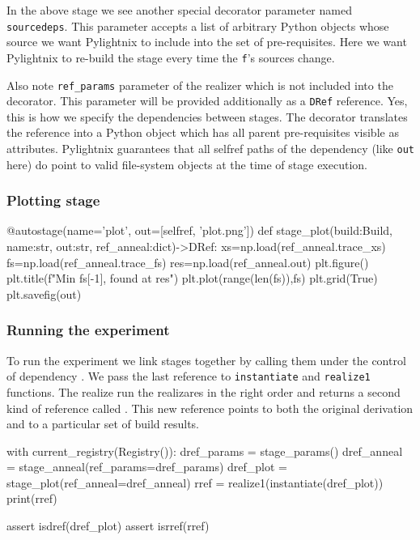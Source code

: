 In the above stage we see another special decorator parameter named
\texttt{sourcedeps}. This parameter accepts a list of arbitrary Python objects
whose source we want Pylightnix to include into the set of pre-requisites. Here
we want Pylightnix to re-build the stage every time the \texttt{f}'s sources
change.

Also note \texttt{ref\_params} parameter of the realizer which is not included
into the decorator. This parameter will be provided additionally as a
\texttt{DRef} reference. Yes, this is how we specify the dependencies between
stages. The decorator translates the reference into a Python object which has
all parent pre-requisites visible as attributes. Pylightnix guarantees that all
selfref paths of the dependency (like \texttt{out} here) do point to valid
file-system objects at the time of stage execution.

\subsubsection{Plotting stage}

\begin{pythontexcode}
@autostage(name='plot', out=[selfref, 'plot.png'])
def stage_plot(build:Build, name:str, out:str, ref_anneal:dict)->DRef:
  xs=np.load(ref_anneal.trace_xs)
  fs=np.load(ref_anneal.trace_fs)
  res=np.load(ref_anneal.out)
  plt.figure()
  plt.title(f"Min {fs[-1]}, found at {res}")
  plt.plot(range(len(fs)),fs)
  plt.grid(True)
  plt.savefig(out)
\end{pythontexcode}

\subsubsection{Running the experiment}

To run the experiment we link stages together by calling them under the control
of dependency .  We pass the last
reference to \texttt{instantiate} and \texttt{realize1} functions. The realize
run the realizares in the right order and returns a second kind of reference
called . This new reference
points to both the original derivation and to a particular set of build results.

\begin{pythontexcode}
with current_registry(Registry()):
  dref_params = stage_params()
  dref_anneal = stage_anneal(ref_params=dref_params)
  dref_plot = stage_plot(ref_anneal=dref_anneal)
  rref = realize1(instantiate(dref_plot))
  print(rref)

  assert isdref(dref_plot)
  assert isrref(rref)
\end{pythontexcode}

